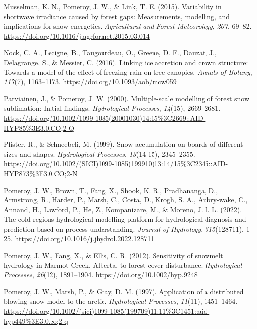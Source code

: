 \documentclass[
  letterpaper,
  DIV=11,
  numbers=noendperiod]{scrartcl}
\newlength{\cslhangindent}
\newenvironment{CSLReferences}[2] %
 {\begin{list}{}{%
  \setlength{\itemindent}{0pt}
  \setlength{\leftmargin}{0pt}
  \setlength{\parsep}{0pt}
  \ifodd #1
   \setlength{\leftmargin}{\cslhangindent}
   \setlength{\itemindent}{-1\cslhangindent}
  \fi
  \setlength{\itemsep}{#2\baselineskip}}}
 {\end{list}}
\begin{document}
\begin{CSLReferences}{1}{0}
Musselman, K. N., Pomeroy, J. W., \& Link, T. E. (2015). Variability in
shortwave irradiance caused by forest gaps: {Measurements}, modelling,
and implications for snow energetics. \emph{Agricultural and Forest
Meteorology}, \emph{207}, 69--82.
\url{https://doi.org/10.1016/j.agrformet.2015.03.014}

Nock, C. A., Lecigne, B., Taugourdeau, O., Greene, D. F., Dauzat, J.,
Delagrange, S., \& Messier, C. (2016). Linking ice accretion and crown
structure: Towards a model of the effect of freezing rain on tree
canopies. \emph{Annals of Botany}, \emph{117}(7), 1163--1173.
\url{https://doi.org/10.1093/aob/mcw059}

Parviainen, J., \& Pomeroy, J. W. (2000). Multiple-scale modelling of
forest snow sublimation: {Initial} findings. \emph{Hydrological
Processes}, \emph{14}(15), 2669--2681.
\url{https://doi.org/10.1002/1099-1085(20001030)14:15\%3C2669::AID-HYP85\%3E3.0.CO;2-Q}

Pfister, R., \& Schneebeli, M. (1999). Snow accumulation on boards of
different sizes and shapes. \emph{Hydrological Processes},
\emph{13}(14-15), 2345--2355.
\url{https://doi.org/10.1002/(SICI)1099-1085(199910)13:14/15\%3C2345::AID-HYP873\%3E3.0.CO;2-N}

Pomeroy, J. W., Brown, T., Fang, X., Shook, K. R., Pradhananga, D.,
Armstrong, R., Harder, P., Marsh, C., Costa, D., Krogh, S. A.,
Aubry-wake, C., Annand, H., Lawford, P., He, Z., Kompanizare, M., \&
Moreno, J. I. L. (2022). The cold regions hydrological modelling
platform for hydrological diagnosis and prediction based on process
understanding. \emph{Journal of Hydrology}, \emph{615}(128711), 1--25.
\url{https://doi.org/10.1016/j.jhydrol.2022.128711}

Pomeroy, J. W., Fang, X., \& Ellis, C. R. (2012). Sensitivity of
snowmelt hydrology in {Marmot Creek}, {Alberta}, to forest cover
disturbance. \emph{Hydrological Processes}, \emph{26}(12), 1891--1904.
\url{https://doi.org/10.1002/hyp.9248}

Pomeroy, J. W., Marsh, P., \& Gray, D. M. (1997). Application of a
distributed blowing snow model to the arctic. \emph{Hydrological
Processes}, \emph{11}(11), 1451--1464.
\url{https://doi.org/10.1002/(sici)1099-1085(199709)11:11\%3C1451::aid-hyp449\%3E3.0.co;2-q}


\end{CSLReferences}
\end{document}
